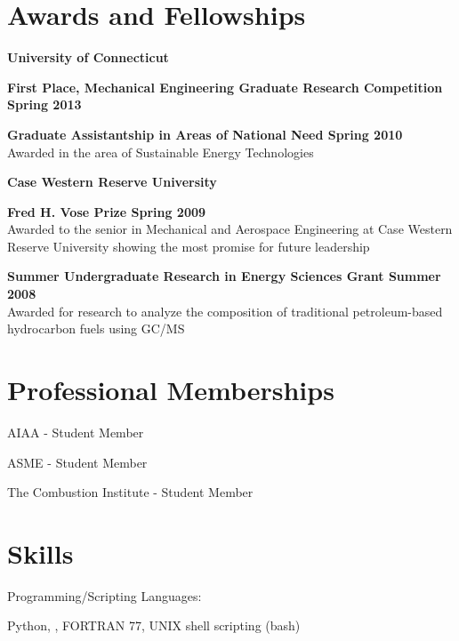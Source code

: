 \section{Awards and Fellowships}
{\bf University of Connecticut}
\begin{outerlist}
   \item {\bf First Place, Mechanical Engineering Graduate Research Competition \hfill Spring 2013}

   \item {\bf Graduate Assistantship in Areas of National Need \hfill Spring 2010}\\
Awarded in the area of Sustainable Energy Technologies
\end{outerlist}
\vspace{0.1in}
{\bf Case Western Reserve University}
\begin{outerlist}

   \item {\bf Fred H. Vose Prize \hfill Spring 2009}\\
Awarded to the senior in Mechanical and Aerospace Engineering at Case Western Reserve University showing the most promise for future leadership

   \item {\bf Summer Undergraduate Research in Energy Sciences Grant \hfill Summer 2008}\\
Awarded for research to analyze the composition of traditional petroleum-based hydrocarbon fuels using GC/MS

\end{outerlist}

\section{Professional Memberships}
AIAA - Student Member

ASME - Student Member

The Combustion Institute - Student Member


\section{Skills}
Programming/Scripting Languages:
%
\begin{innerlist}
    \item Python, \Matlab, FORTRAN 77, UNIX shell scripting (bash)
\end{innerlist}

\halfblankline

